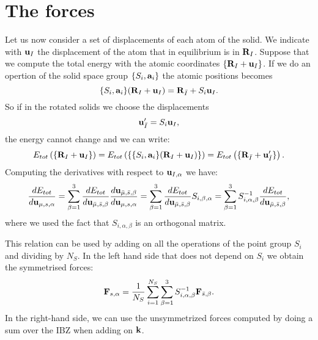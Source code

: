 \documentclass[12pt,a4paper,twoside]{report}
\begin{document}
\section{The forces}

Let us now consider a set of displacements of each atom of the solid. We indicate with ${\bf u}_{I}$ the displacement of the atom that in equilibrium is in
${\bf R}_I$. Suppose that we compute the total energy
with the atomic coordinates $\{{\bf R}_I + {\bf u}_I\}$.
If we do an opertion of the solid space group
$\{S_i,{\bf a}_i\}$ the atomic positions becomes
\begin{equation}
\{S_i,{\bf a}_i\} ({\bf R}_I + {\bf u}_I) = 
{\bf R}_{\bar I} + S_i {\bf u}_I.
\end{equation}
So if in the rotated solids we choose the displacements
\begin{equation}
{\bf u}'_{\bar I} =  S_i {\bf u}_I,
\label{rotated_disp}
\end{equation}
the energy cannot change and we can write:
\begin{equation}
E_{tot}\left(\{{\bf R}_I + {\bf u}_I\}\right) = E_{tot}\left (\{\{S_i,{\bf a}_i\} ({\bf R}_I + {\bf u}_I)\}\right )=
E_{tot}\left(\{ {\bf R}_{\bar I} + {\bf u}'_{\bar I}\}\right).
\end{equation}
Computing the derivatives with respect to ${\bf u}_{I,\alpha}$ we have:
\begin{equation}
{d E_{tot} \over d {\bf u}_{\mu,s,\alpha}} = \sum_{\beta=1}^3
{d E_{tot} \over d {\bf u}_{{\bar \mu},{\bar s},\beta}} 
{d {\bf u}_{{\bar \mu},{\bar s},\beta} \over
d {\bf u}_{\mu, s,\alpha}}=\sum_{\beta=1}^3
{d E_{tot} \over d {\bf u}_{{\bar \mu},{\bar s},\beta}} 
S_{i,\beta,\alpha}=\sum_{\beta=1}^3 S^{-1}_{i,\alpha,\beta}
{d E_{tot} \over d {\bf u}_{{\bar \mu},{\bar s},\beta}},
\end{equation}
where we used the fact that $S_{i,\alpha,\beta}$ is an orthogonal matrix.

This relation can be used by adding on all the operations of the point group $S_i$ and dividing by
$N_S$. In the left hand side that does not depend on
$S_i$ we obtain the symmetrised forces:
\begin{equation}
{\bf F}_{s,\alpha} ={1 \over N_S} \sum_{i=1}^{N_S} \sum_{\beta=1}^3 S^{-1}_{i,\alpha,\beta}
{\bf F}_{\bar s,\beta}.
\label{symforce}
\end{equation}
In the right-hand side, we can use the unsymmetrized
forces computed by doing a sum over the IBZ when
adding on ${\bf k}$.
\end{document}
